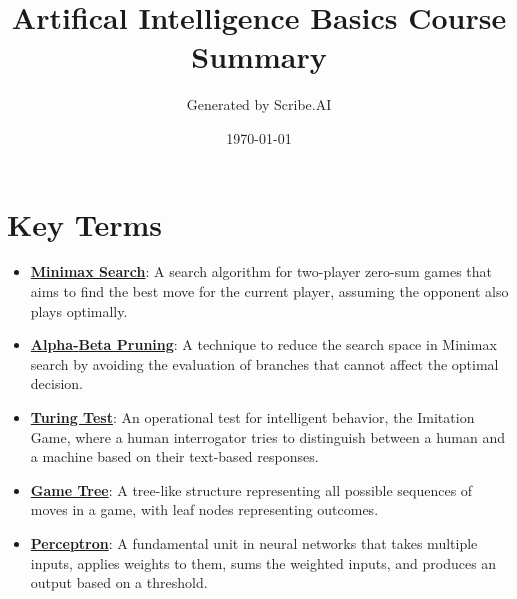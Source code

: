 \documentclass{article}%
\title{Artifical Intelligence Basics Course Summary}%
\author{Generated by Scribe.AI}%
\date{\today}%
\begin{document}
%
\normalsize%
\maketitle%
\section{Key Terms}%
\label{sec:KeyTerms}%
\begin{itemize}[leftmargin=*]%
\item \href{https://purdue.brightspace.com/d2l/common/assets/pdfjs-d2l-dist/1.0.14-legacy/web/viewer.html?file=%2Fcontent%2Fenforced%2F1095467-wl.202510.CS.24300.001%2F02L2-Intro.pdf%3Fou%3D1095467&lang=en-us&container=d2l-fileviewer-rendered-pdf&fullscreen=d2l-fileviewer-rendered-pdf-dialog&height=667#page=22}{\textbf{Minimax Search}}: A search algorithm for two-player zero-sum games that aims to find the best move for the current player, assuming the opponent also plays optimally.%
\item \href{https://purdue.brightspace.com/d2l/common/assets/pdfjs-d2l-dist/1.0.14-legacy/web/viewer.html?file=%2Fcontent%2Fenforced%2F1095467-wl.202510.CS.24300.001%2F02L2-Intro.pdf%3Fou%3D1095467&lang=en-us&container=d2l-fileviewer-rendered-pdf&fullscreen=d2l-fileviewer-rendered-pdf-dialog&height=667#page=23}{\textbf{Alpha{-}Beta Pruning}}: A technique to reduce the search space in Minimax search by avoiding the evaluation of branches that cannot affect the optimal decision.%
\item \href{https://purdue.brightspace.com/d2l/common/assets/pdfjs-d2l-dist/1.0.14-legacy/web/viewer.html?file=%2Fcontent%2Fenforced%2F1095467-wl.202510.CS.24300.001%2F02L2-Intro.pdf%3Fou%3D1095467&lang=en-us&container=d2l-fileviewer-rendered-pdf&fullscreen=d2l-fileviewer-rendered-pdf-dialog&height=667#page=6}{\textbf{Turing Test}}: An operational test for intelligent behavior, the Imitation Game, where a human interrogator tries to distinguish between a human and a machine based on their text-based responses.%
\item \href{https://purdue.brightspace.com/d2l/common/assets/pdfjs-d2l-dist/1.0.14-legacy/web/viewer.html?file=%2Fcontent%2Fenforced%2F1095467-wl.202510.CS.24300.001%2F02L2-Intro.pdf%3Fou%3D1095467&lang=en-us&container=d2l-fileviewer-rendered-pdf&fullscreen=d2l-fileviewer-rendered-pdf-dialog&height=667#page=11}{\textbf{Game Tree}}: A tree-like structure representing all possible sequences of moves in a game, with leaf nodes representing outcomes.%
\item \href{https://purdue.brightspace.com/d2l/common/assets/pdfjs-d2l-dist/1.0.14-legacy/web/viewer.html?file=%2Fcontent%2Fenforced%2F1095467-wl.202510.CS.24300.001%2F02L2-Intro.pdf%3Fou%3D1095467&lang=en-us&container=d2l-fileviewer-rendered-pdf&fullscreen=d2l-fileviewer-rendered-pdf-dialog&height=667#page=45}{\textbf{Perceptron}}: A fundamental unit in neural networks that takes multiple inputs, applies weights to them, sums the weighted inputs, and produces an output based on a threshold.%

\end{itemize}
\end{document}
